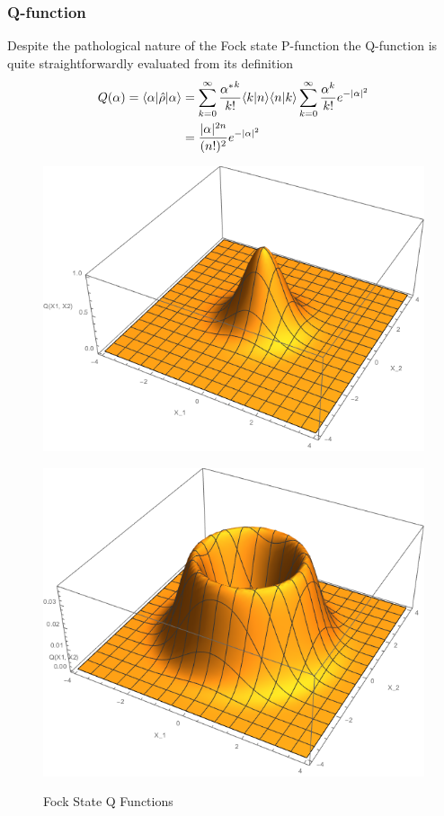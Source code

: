 \subsubsection{Q-function}
Despite the pathological nature of the Fock state P-function the Q-function is quite straightforwardly evaluated from its definition
\begin{align}
	 Q(\alpha) = \langle \alpha | \hat{\rho} | \alpha \rangle  &= \sum_{k=0}^\infty \frac {{\alpha^*}^k}{k!} \langle k | n \rangle\langle n | k \rangle \sum_{k=0}^\infty \frac {\alpha^k}{k!}e^{-|\alpha|^2} \\ &= \frac{|\alpha|^{2n}}{(n!)^2} e^{-|\alpha|^2}
\end{align}
\begin{figure}[H]
	\begin{minipage}[b]{.5\linewidth}
		\centering \large \includegraphics[width=1\textwidth]{Images/Q Function-n=0.png} 
		\label{fig:Qn=0}
	\end{minipage}%
	\begin{minipage}[b]{.5\linewidth}
		\centering\large \includegraphics[width = 1\textwidth]{Images/Q Function-n=3.png}
		\label{fig:Qn=5}
	\end{minipage}
	\caption{Fock State Q Functions}\label{Qfunctions}
\end{figure}

